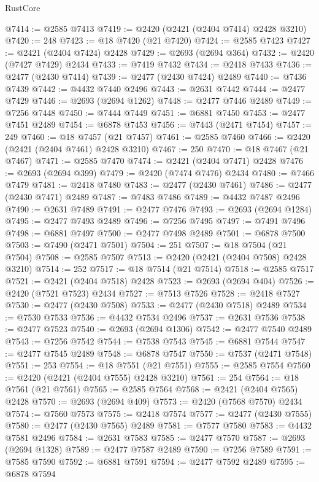 \begin{lexlean}{RustCore}
\begin{coremodule}
@7414 := @2585 @7413
@7419 := @2420 (@2421 (@2404 @7414) @2428 @3210)
@7420 := 248
@7423 := @18 @7420 (@21 @7420)
@7424 := @2585 @7423
@7427 := @2421 (@2404 @7424) @2428
@7429 := @2693 (@2694 @364)
@7432 := @2420 (@7427 @7429) @2434
@7433 := @7419 @7432
@7434 := @2418 @7433
@7436 := @2477 (@2430 @7414)
@7439 := @2477 (@2430 @7424) @2489
@7440 := @7436 @7439
@7442 := @4432 @7440 @2496
@7443 := @2631 @7442
@7444 := @2477 @7429
@7446 := @2693 (@2694 @1262)
@7448 := @2477 @7446 @2489
@7449 := @7256 @7448
@7450 := @7444 @7449
@7451 := @6881 @7450
@7453 := @2477 @7451 @2489
@7454 := @6878 @7453
@7456 := @7443 (@2471 @7454)
@7457 := 249
@7460 := @18 @7457 (@21 @7457)
@7461 := @2585 @7460
@7466 := @2420 (@2421 (@2404 @7461) @2428 @3210)
@7467 := 250
@7470 := @18 @7467 (@21 @7467)
@7471 := @2585 @7470
@7474 := @2421 (@2404 @7471) @2428
@7476 := @2693 (@2694 @399)
@7479 := @2420 (@7474 @7476) @2434
@7480 := @7466 @7479
@7481 := @2418 @7480
@7483 := @2477 (@2430 @7461)
@7486 := @2477 (@2430 @7471) @2489
@7487 := @7483 @7486
@7489 := @4432 @7487 @2496
@7490 := @2631 @7489
@7491 := @2477 @7476
@7493 := @2693 (@2694 @1284)
@7495 := @2477 @7493 @2489
@7496 := @7256 @7495
@7497 := @7491 @7496
@7498 := @6881 @7497
@7500 := @2477 @7498 @2489
@7501 := @6878 @7500
@7503 := @7490 (@2471 @7501)
@7504 := 251
@7507 := @18 @7504 (@21 @7504)
@7508 := @2585 @7507
@7513 := @2420 (@2421 (@2404 @7508) @2428 @3210)
@7514 := 252
@7517 := @18 @7514 (@21 @7514)
@7518 := @2585 @7517
@7521 := @2421 (@2404 @7518) @2428
@7523 := @2693 (@2694 @404)
@7526 := @2420 (@7521 @7523) @2434
@7527 := @7513 @7526
@7528 := @2418 @7527
@7530 := @2477 (@2430 @7508)
@7533 := @2477 (@2430 @7518) @2489
@7534 := @7530 @7533
@7536 := @4432 @7534 @2496
@7537 := @2631 @7536
@7538 := @2477 @7523
@7540 := @2693 (@2694 @1306)
@7542 := @2477 @7540 @2489
@7543 := @7256 @7542
@7544 := @7538 @7543
@7545 := @6881 @7544
@7547 := @2477 @7545 @2489
@7548 := @6878 @7547
@7550 := @7537 (@2471 @7548)
@7551 := 253
@7554 := @18 @7551 (@21 @7551)
@7555 := @2585 @7554
@7560 := @2420 (@2421 (@2404 @7555) @2428 @3210)
@7561 := 254
@7564 := @18 @7561 (@21 @7561)
@7565 := @2585 @7564
@7568 := @2421 (@2404 @7565) @2428
@7570 := @2693 (@2694 @409)
@7573 := @2420 (@7568 @7570) @2434
@7574 := @7560 @7573
@7575 := @2418 @7574
@7577 := @2477 (@2430 @7555)
@7580 := @2477 (@2430 @7565) @2489
@7581 := @7577 @7580
@7583 := @4432 @7581 @2496
@7584 := @2631 @7583
@7585 := @2477 @7570
@7587 := @2693 (@2694 @1328)
@7589 := @2477 @7587 @2489
@7590 := @7256 @7589
@7591 := @7585 @7590
@7592 := @6881 @7591
@7594 := @2477 @7592 @2489
@7595 := @6878 @7594

\end{coremodule}
\end{lexlean}
